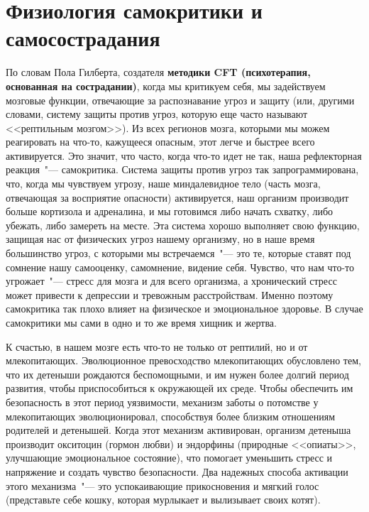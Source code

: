 
\chapter{Физиология самокритики и самосострадания} \label{The_Physiology_of_Self-Criticism_and_Self-Compassion}

По словам Пола Гилберта, создателя \textbf{методики CFT (психотерапия, основанная на сострадании)}, когда мы критикуем себя, мы задействуем мозговые функции, отвечающие за распознавание угроз и защиту (или, другими словами, систему защиты против угроз, которую еще часто называют <<рептильным мозгом>>). Из всех регионов мозга, которыми мы можем реагировать на что-то, кажущееся опасным, этот легче и быстрее всего активируется. Это значит, что часто, когда что-то идет не так, наша рефлекторная реакция~"--- самокритика. Система защиты против угроз так запрограммирована, что, когда мы чувствуем угрозу, наше миндалевидное тело (часть мозга, отвечающая за восприятие опасности) активируется, наш организм производит больше кортизола и адреналина, и мы готовимся либо начать схватку, либо убежать, либо замереть на месте. Эта система хорошо выполняет свою функцию, защищая нас от физических угроз нашему организму, но в наше время большинство угроз, с которыми мы встречаемся~"--- это те, которые ставят под сомнение нашу самооценку, самомнение, видение себя. Чувство, что нам что-то угрожает~"--- стресс для мозга и для всего организма, а хронический стресс может привести к депрессии и тревожным расстройствам. Именно поэтому самокритика так плохо влияет на физическое и эмоциональное здоровье. В случае самокритики мы сами в одно и то же время хищник и жертва. 

К счастью, в нашем мозге есть что-то не только от рептилий, но и от млекопитающих. Эволюционное превосходство млекопитающих обусловлено тем, что их детеныши рождаются беспомощными, и им нужен более долгий период развития, чтобы приспособиться к окружающей их среде. Чтобы обеспечить им безопасность в этот период уязвимости, механизм заботы о потомстве у млекопитающих эволюционировал, способствуя более близким отношениям родителей и детенышей. Когда этот механизм активирован, организм детеныша производит окситоцин (гормон любви) и эндорфины (природные <<опиаты>>, улучшающие эмоциональное состояние), что помогает уменьшить стресс и напряжение и  создать чувство безопасности. Два надежных способа активации этого механизма~"--- это успокаивающие прикосновения и мягкий голос (представьте себе кошку, которая мурлыкает и вылизывает своих котят).  

